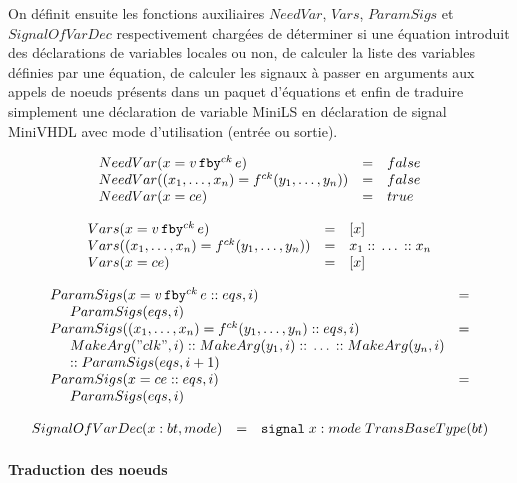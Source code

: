 \documentclass[a4paper]{article}
\newcommand{\mybox}[1]{\mbox{\tt{#1}}}
\newcommand{\ind}[0]{\hspace{0.5cm}}
\newcommand{\Cons}[0]{\; \mathbf{::} \;}
\newcommand{\Fby}[2]{#1 \, \mybox{fby}^{ck} \, #2}
\newcommand{\App}[2]{#1^{ck}(#2)}
\begin{document}
On d\'efinit ensuite les fonctions auxiliaires $NeedVar$, $Vars$, $ParamSigs$ et
$SignalOfVarDec$ respectivement charg\'ees de d\'eterminer si une \'equation introduit
des d\'eclarations de variables locales ou non, de calculer la liste des variables
d\'efinies par une \'equation, de calculer les signaux \`a passer en arguments aux
appels de noeuds pr\'esents dans un paquet d'\'equations et enfin de traduire
simplement une d\'eclaration de variable MiniLS en d\'eclaration de signal MiniVHDL
avec mode d'utilisation (entr\'ee ou sortie).

\newcommand{\NV}[1]{NeedVar(#1)}
\newcommand{\V}[1]{Vars(#1)}
\newcommand{\PS}[2]{ParamSigs(#1,#2)}
\newcommand{\SoVD}[3]{SignalOfVarDec(#1 : #2, #3)}

\[
\begin{array}{lcl}
  \NV{x = \Fby{v}{e}} & = & false \\
  \NV{(x_1,\dots,x_n) = \App{f}{y_1,\dots,y_n}} & = & false \\
  \NV{x = ce} & = & true
\end{array}
\]

\[
\begin{array}{lcl}
  \V{x = \Fby{v}{e}} & = & [x] \\
  \V{(x_1,\dots,x_n) = \App{f}{y_1,\dots,y_n}} & = & x_1 \Cons \dots \Cons x_n \\
  \V{x = ce} & = & [x]
\end{array}
\]

\[
\begin{array}{ll}
  \PS{x = \Fby{v}{e} \Cons eqs}{i} & = \\
  \ind \PS{eqs}{i} \\
  \PS{(x_1,\dots,x_n) = \App{f}{y_1,\dots,y_n} \Cons eqs}{i} & = \\
  \ind \MA{"clk"}{i} \Cons \MA{y_1}{i} \Cons \dots \Cons \MA{y_n}{i} \\
  \ind \mathtt{::} \; \PS{eqs}{i + 1}
  \\
  \PS{x = ce \Cons eqs}{i} & = \\
  \ind \PS{eqs}{i}
\end{array}
\]

\[
\begin{array}[lcl]{lcl}
  \SoVD{x}{bt}{mode} & = & \mybox{signal} \; x : mode \; TransBaseType(bt)
\end{array}
\]

\paragraph{Traduction des noeuds}
\end{document}
